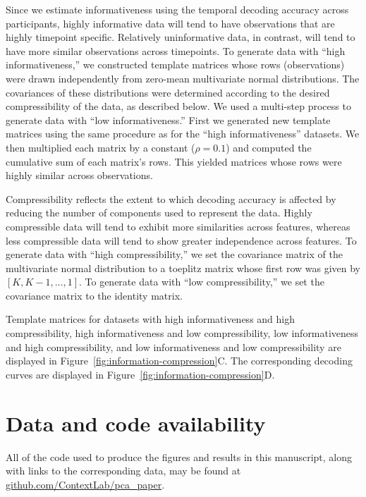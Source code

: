 \documentclass[english, 11pt]{article}
\begin{document}
Since we estimate informativeness using the temporal decoding accuracy across
participants, highly informative data will tend to have observations that are
highly timepoint specific. Relatively uninformative data, in contrast, will
tend to have more similar observations across timepoints. To generate data with
``high informativeness,'' we constructed template matrices whose rows
(observations) were drawn independently from zero-mean multivariate normal
distributions. The covariances of these distributions were determined according
to the desired compressibility of the data, as described below. We used a
multi-step process to generate data with ``low informativeness.'' First we
generated new template matrices using the same procedure as for the ``high
informativeness'' datasets. We then multiplied each matrix by a constant ($\rho
= 0.1$) and computed the cumulative sum of each matrix's rows. This yielded
matrices whose rows were highly similar across observations.

Compressibility reflects the extent to which decoding accuracy is affected by
reducing the number of components used to represent the data. Highly
compressible data will tend to exhibit more similarities across features,
whereas less compressible data will tend to show greater independence across
features. To generate data with ``high compressibility,'' we set the covariance
matrix of the multivariate normal distribution to a toeplitz matrix whose first
row was given by $\left[K, K - 1, ..., 1\right]$. To generate data with ``low
compressibility,'' we set the covariance matrix to the identity matrix.

Template matrices for datasets with high informativeness and high
compressibility, high informativeness and low compressibility, low
informativeness and high compressibility, and low informativeness and low
compressibility are displayed in Figure~\ref{fig:information-compression}C. The
corresponding decoding curves are displayed in
Figure~\ref{fig:information-compression}D.



\section*{Data and code availability}

All of the code used to produce the figures and results in this manuscript,
along with links to the corresponding data, may be found at
\href{https://github.com/ContextLab/pca_paper}{github.com/ContextLab/pca\_paper}.
\end{document}
